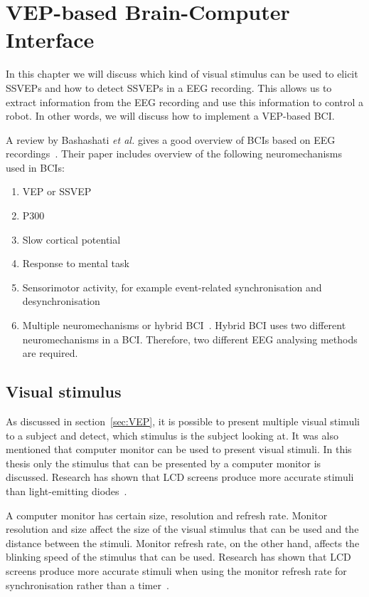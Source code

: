 
\chapter{VEP-based Brain-Computer Interface}

In this chapter we will discuss which kind of visual stimulus can be used to elicit \glspl{SSVEP} and how to detect \glspl{SSVEP} in a \gls{EEG} recording. This allows us to extract information from the \gls{EEG} recording and use this information to control a robot. In other words, we will discuss how to implement a \gls{VEP}-based \gls{BCI}.

A review by Bashashati \emph{et al.} gives a good overview of \glspl{BCI} based on \gls{EEG} recordings~\cite{bci_comparison}. Their paper includes overview of the following neuromechanisms used in \glspl{BCI}:
\begin{enumerate}
	\item \gls{VEP} or \gls{SSVEP}
	\item P300
	\item Slow cortical potential
	\item Response to mental task
	\item Sensorimotor activity, for example event-related synchronisation and desynchronisation
	\item Multiple neuromechanisms or hybrid BCI~\cite{hybrid_bci, hybrid_bci2}. Hybrid BCI uses two different neuromechanisms in a BCI. Therefore, two different \gls{EEG} analysing methods are required.
\end{enumerate}

\section{Visual stimulus}

As discussed in section~\ref{sec:VEP}, it is possible to present multiple visual stimuli to a subject and detect, which stimulus is the subject looking at. It was also mentioned that computer monitor can be used to present visual stimuli. In this thesis only the stimulus that can be presented by a computer monitor is discussed. Research has shown that LCD screens produce more accurate stimuli than light-emitting diodes~\cite{lcd_lcd_led}. 

A computer monitor has certain size, resolution and refresh rate. Monitor resolution and size affect the size of the visual stimulus that can be used and the distance between the stimuli. Monitor refresh rate, on the other hand, affects the blinking speed of the stimulus that can be used. Research has shown that LCD screens produce more accurate stimuli when using the monitor refresh rate for synchronisation rather than a timer~\cite{lcd_lcd_led}.

